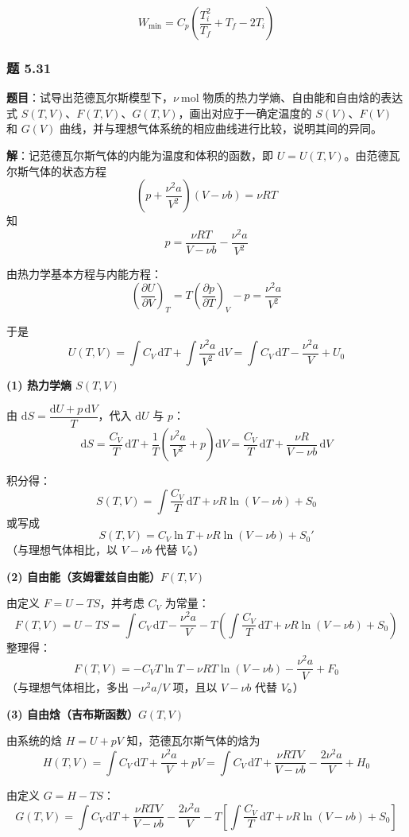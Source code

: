 \documentclass[UTF8]{ctexart}
\begin{document}
\[
\boxed{W_{\min}=C_p\left(\frac{T_i^2}{T_f}+T_f-2T_i\right)}
\]

\subsubsection{题 5.31}

\textbf{题目}：试导出范德瓦尔斯模型下，$\nu\ \mathrm{mol}$ 物质的热力学熵、自由能和自由焓的表达式 $S(T,V)$、$F(T,V)$、$G(T,V)$，画出对应于一确定温度的 $S(V)$、$F(V)$ 和 $G(V)$ 曲线，并与理想气体系统的相应曲线进行比较，说明其间的异同。

\textbf{解}：记范德瓦尔斯气体的内能为温度和体积的函数，即 $U=U(T,V)$。由范德瓦尔斯气体的状态方程
\[
\left(p+\frac{\nu^2 a}{V^2}\right)(V-\nu b)=\nu RT
\]
知
\[
p=\frac{\nu RT}{V-\nu b}-\frac{\nu^2 a}{V^2}
\]

由热力学基本方程与内能方程：
\[
\left(\frac{\partial U}{\partial V}\right)_T
=T\left(\frac{\partial p}{\partial T}\right)_V-p
=\frac{\nu^2 a}{V^2}
\]

于是
\[
U(T,V)=\int C_V\,\mathrm{d}T+\int\frac{\nu^2 a}{V^2}\,\mathrm{d}V
=\int C_V\,\mathrm{d}T-\frac{\nu^2 a}{V}+U_0
\]

\textbf{(1) 热力学熵 $S(T,V)$}

由 $\mathrm{d}S=\dfrac{\mathrm{d}U+p\,\mathrm{d}V}{T}$，代入 $\mathrm{d}U$ 与 $p$：
\[
\mathrm{d}S=\frac{C_V}{T}\,\mathrm{d}T+\frac{1}{T}\!\left(\frac{\nu^2 a}{V^2}+p\right)\mathrm{d}V
=\frac{C_V}{T}\,\mathrm{d}T+\frac{\nu R}{V-\nu b}\,\mathrm{d}V
\]

积分得：
\[
\boxed{S(T,V)=\int\frac{C_V}{T}\,\mathrm{d}T+\nu R\ln(V-\nu b)+S_0}
\]
或写成
\[
S(T,V)=C_V\ln T+\nu R\ln(V-\nu b)+S_0'
\]
（与理想气体相比，以 $V-\nu b$ 代替 $V$。）

\textbf{(2) 自由能（亥姆霍兹自由能）$F(T,V)$}

由定义 $F=U-TS$，并考虑 $C_V$ 为常量：
\[
F(T,V)=U-TS
=\int C_V\,\mathrm{d}T-\frac{\nu^2 a}{V}
-T\!\left(\int\frac{C_V}{T}\,\mathrm{d}T+\nu R\ln(V-\nu b)+S_0\right)
\]
整理得：
\[
\boxed{F(T,V)=-C_VT\ln T-\nu RT\ln(V-\nu b)-\frac{\nu^2 a}{V}+F_0}
\]
（与理想气体相比，多出 $-\nu^2 a/V$ 项，且以 $V-\nu b$ 代替 $V$。）

\textbf{(3) 自由焓（吉布斯函数）$G(T,V)$}

由系统的焓 $H=U+pV$ 知，范德瓦尔斯气体的焓为
\[
H(T,V)=\int C_V\,\mathrm{d}T+\frac{\nu^2 a}{V}+pV
=\int C_V\,\mathrm{d}T+\frac{\nu RTV}{V-\nu b}-\frac{2\nu^2 a}{V}+H_0
\]

由定义 $G=H-TS$：
\[
\boxed{G(T,V)=\int C_V\,\mathrm{d}T+\frac{\nu RTV}{V-\nu b}-\frac{2\nu^2 a}{V}
-T\!\left[\int\frac{C_V}{T}\,\mathrm{d}T+\nu R\ln(V-\nu b)+S_0\right]}
\]
\end{document}
